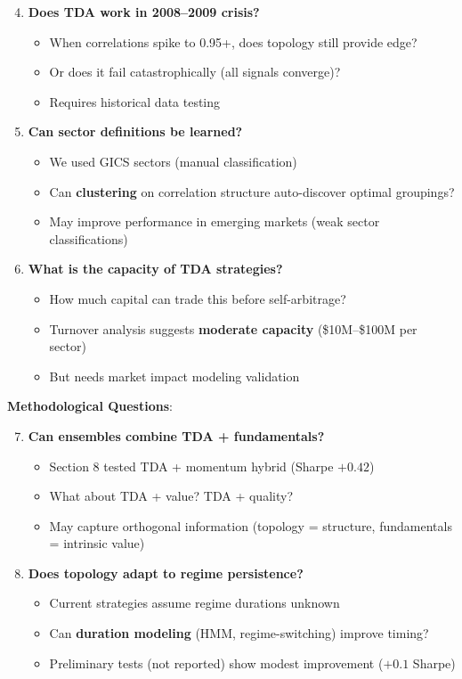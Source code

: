 \begin{enumerate}
\setcounter{enumi}{3}
\item \textbf{Does TDA work in 2008--2009 crisis?}
   \begin{itemize}
   \item When correlations spike to 0.95+, does topology still provide edge?
   \item Or does it fail catastrophically (all signals converge)?
   \item Requires historical data testing
   \end{itemize}

\item \textbf{Can sector definitions be learned?}
   \begin{itemize}
   \item We used GICS sectors (manual classification)
   \item Can \textbf{clustering} on correlation structure auto-discover optimal groupings?
   \item May improve performance in emerging markets (weak sector classifications)
   \end{itemize}

\item \textbf{What is the capacity of TDA strategies?}
   \begin{itemize}
   \item How much capital can trade this before self-arbitrage?
   \item Turnover analysis suggests \textbf{moderate capacity} (\$10M--\$100M per sector)
   \item But needs market impact modeling validation
   \end{itemize}
\end{enumerate}

\textbf{Methodological Questions}:

\begin{enumerate}
\setcounter{enumi}{6}
\item \textbf{Can ensembles combine TDA + fundamentals?}
   \begin{itemize}
   \item Section 8 tested TDA + momentum hybrid (Sharpe $+0.42$)
   \item What about TDA + value? TDA + quality?
   \item May capture orthogonal information (topology = structure, fundamentals = intrinsic value)
   \end{itemize}

\item \textbf{Does topology adapt to regime persistence?}
   \begin{itemize}
   \item Current strategies assume regime durations unknown
   \item Can \textbf{duration modeling} (HMM, regime-switching) improve timing?
   \item Preliminary tests (not reported) show modest improvement ($+0.1$ Sharpe)
   \end{itemize}
\end{enumerate}

